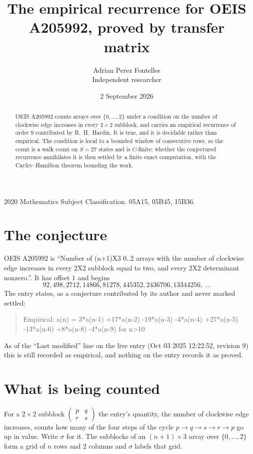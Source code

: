 \documentclass[11pt,a4paper]{article}
\title{The empirical recurrence for OEIS A205992, proved by transfer matrix}
\author{Adrian Perez Fontelles\\ \small Independent researcher}
\date{2 September 2026}
\theoremstyle{plain}
\theoremstyle{definition}
\begin{document}
\maketitle

\begin{abstract}
OEIS A205992 counts arrays over $\{0,\dots,2\}$ under a condition on the number of clockwise edge increases
in every $2\times2$ subblock, and carries an empirical recurrence of order $9$ contributed by
R.~H.~Hardin. It is true, and it is decidable rather than empirical. The condition is local to
a bounded window of consecutive rows, so the count is a walk count on $S=27$ states and is
$C$-finite; whether the conjectured recurrence annihilates it is then settled by a finite exact
computation, with the Cayley--Hamilton theorem bounding the work.
\end{abstract}

\noindent\small 2020 Mathematics Subject Classification. 05A15, 05B45, 15B36.\normalsize

\section{The conjecture}

OEIS A205992 is ``Number of (n+1)X3 0..2 arrays with the number of clockwise edge increases in every 2X2 subblock equal to two, and every 2X2 determinant nonzero.''. It has offset $1$ and begins
\[
92, 498, 2712, 14866, 81278, 445352, 2436706, 13344256,\ \dots
\]
The entry states, as a conjecture contributed by its author and never marked settled:
\begin{quote}
Empirical: a(n) = 3*a(n-1) +17*a(n-2) -19*a(n-3) -4*a(n-4) +27*a(n-5) -13*a(n-6) +8*a(n-8) -4*a(n-9) for n>10
\end{quote}
As of the ``Last modified'' line on the live entry (Oct 03 2025 12:22:52, revision 9) this is still
recorded as empirical, and nothing on the entry records it as proved.

\section{What is being counted}

For a $2\times2$ subblock $\begin{pmatrix}p&q\\r&s\end{pmatrix}$ the
entry's quantity, the number of clockwise edge increases, counts how many of the four steps of the cycle $p\to q\to s\to r\to p$ go up in value. Write $\sigma$ for it. The subblocks of an
$(n+1)\times3$ array over $\{0,\dots,2\}$ form a grid of $n$ rows and $2$
columns and $\sigma$ labels that grid.
\end{document}
